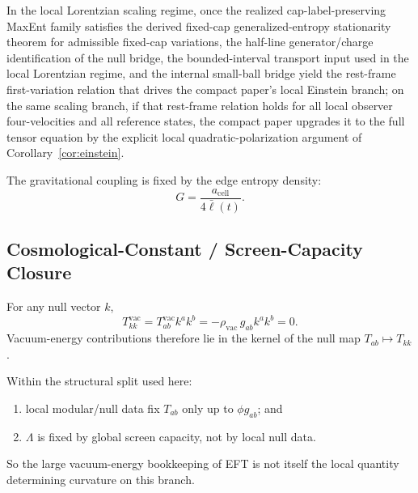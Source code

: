 \begin{theorem}
In the local Lorentzian scaling regime, once the realized cap-label-preserving MaxEnt family satisfies the derived fixed-cap generalized-entropy stationarity theorem for admissible fixed-cap variations, the half-line
generator/charge identification of the null bridge, the bounded-interval transport input used in
the local Lorentzian regime, and the internal small-ball bridge yield the rest-frame first-variation
relation that drives the compact paper's local Einstein branch; on the same scaling branch, if that
rest-frame relation holds for all local observer four-velocities and all reference states, the
compact paper upgrades it to the full tensor equation by the explicit local quadratic-polarization
argument of Corollary~\ref{cor:einstein}.
\end{theorem}

\begin{theorem}
The gravitational coupling is fixed by the edge entropy density:
\[
G=\frac{a_{\mathrm{cell}}}{4\bar{\ell}(t)}.
\]
\end{theorem}

\subsection{Cosmological-Constant / Screen-Capacity Closure}

\begin{lemma}
For any null vector \(k\),
\[
T^{\mathrm{vac}}_{kk}
=
T^{\mathrm{vac}}_{ab}k^ak^b
=
-\rho_{\mathrm{vac}}\,g_{ab}k^ak^b
=
0.
\]
Vacuum-energy contributions therefore lie in the kernel of the null map
\(T_{ab}\mapsto T_{kk}\).
\end{lemma}

\begin{proposition}
Within the structural split used here:
\begin{enumerate}[leftmargin=2em]
\item local modular/null data fix \(T_{ab}\) only up to \(\phi g_{ab}\); and
\item \(\Lambda\) is fixed by global screen capacity, not by local null data.
\end{enumerate}
So the large vacuum-energy bookkeeping of EFT is not itself the local quantity determining
curvature on this branch.
\end{proposition}

